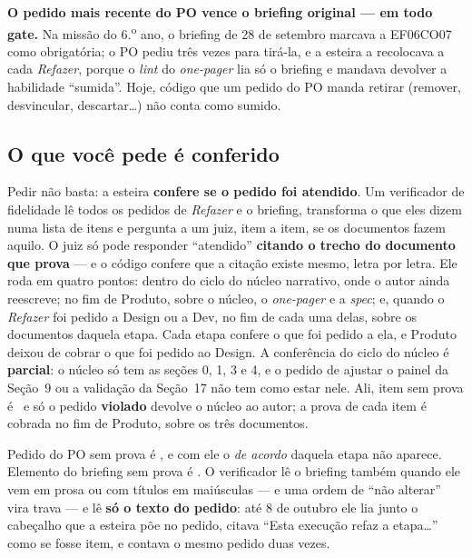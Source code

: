 \documentclass[11pt,a4paper]{article}
\newcommand{\bolinha}[1]{\tikz[baseline=-0.5ex]{\fill[#1] (0,0) circle (0.33em);}}
\newcommand{\statusAmbar}{\bolinha{sinalAmbar}}
\newcommand{\statusVermelho}{\bolinha{sinalVermelho}}
\begin{document}
\textbf{O pedido mais recente do PO vence o briefing original --- em todo gate.} Na missão do 6.\textsuperscript{o} ano, o briefing de 28 de setembro marcava a EF06CO07 como obrigatória; o PO pediu três vezes para tirá-la, e a esteira a recolocava a cada \emph{Refazer}, porque o \emph{lint} do \emph{one-pager} lia só o briefing e mandava devolver a habilidade ``sumida''. Hoje, código que um pedido do PO manda retirar (remover, desvincular, descartar\ldots) não conta como sumido.

\subsection{O que você pede é conferido}
\label{sec:conferido}

Pedir não basta: a esteira \textbf{confere se o pedido foi atendido}. Um verificador de fidelidade lê todos os pedidos de \emph{Refazer} e o briefing, transforma o que eles dizem numa lista de itens e pergunta a um juiz, item a item, se os documentos fazem aquilo. O juiz só pode responder ``atendido'' \textbf{citando o trecho do documento que prova} --- e o código confere que a citação existe mesmo, letra por letra. Ele roda em quatro pontos: dentro do ciclo do núcleo narrativo, onde o autor ainda reescreve; no fim de Produto, sobre o núcleo, o \emph{one-pager} e a \emph{spec}; e, quando o \emph{Refazer} foi pedido a Design ou a Dev, no fim de cada uma delas, sobre os documentos daquela etapa. Cada etapa confere o que foi pedido a ela, e Produto deixou de cobrar o que foi pedido ao Design. A conferência do ciclo do núcleo é \textbf{parcial}: o núcleo só tem as seções 0, 1, 3 e 4, e o pedido de ajustar o painel da Seção~9 ou a validação da Seção~17 não tem como estar nele. Ali, item sem prova é \statusAmbar\ e só o pedido \textbf{violado} devolve o núcleo ao autor; a prova de cada item é cobrada no fim de Produto, sobre os três documentos.

Pedido do PO sem prova é \statusVermelho, e com ele o \emph{de acordo} daquela etapa não aparece. Elemento do briefing sem prova é \statusAmbar. O verificador lê o briefing também quando ele vem em prosa ou com títulos em maiúsculas --- e uma ordem de ``não alterar'' vira trava --- e lê \textbf{só o texto do pedido}: até 8 de outubro ele lia junto o cabeçalho que a esteira põe no pedido, citava ``Esta execução refaz a etapa\ldots'' como se fosse item, e contava o mesmo pedido duas vezes.
\end{document}

